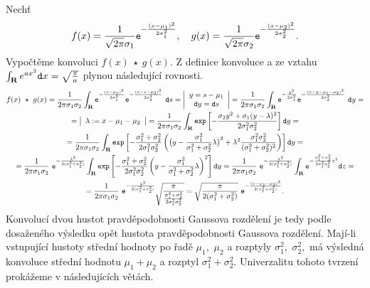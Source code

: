 Nech\v t $$f(x) =
\frac{1}{\sqrt{2\pi}\sigma_1}\mathtt{e}^{-\frac{(x-\mu_1)^2}{2\sigma_1^2}},\quad g(x) =
\frac{1}{\sqrt{2\pi}\sigma_2}\mathtt{e}^{-\frac{(x-\mu_2)^2}{2\sigma_2^2}}.$$ Vypo\v ct\v eme konvoluci $f(x)~\star~g(x).$ Z definice konvoluce a ze vztahu $\int_{{\mathbf R}}e^{ax^2}\mathtt{d}x=\sqrt{\frac{\pi}{a}}$ plynou následující rovnosti.
%
\begin{multline*}
f(x)~\star~g(x)=\frac{1}{2\pi\sigma_1\sigma_2}\int_{\mathbf R}  \mathtt{e}^{-\frac{(s-\mu_1)^2}{2\sigma_1^2}}\mathtt{e}^{-\frac{(x-s-\mu_2)^2}{2\sigma_2^2}}~\mathtt{d}s=\left|\begin{array}{c} y=s-\mu_1\\ \mathtt{d}y=\mathtt{d}s \end{array}\right|=\frac{1}{2\pi\sigma_1\sigma_2}\int_{\mathbf R}  \mathtt{e}^{-\frac{y^2}{2\sigma_1^2}}\mathtt{e}^{-\frac{(x-y-\mu_1-\mu_2)^2}{2\sigma_2^2}}~\mathtt{d}y{}=\\
=\left|\begin{array}{c} \lambda :=x-\mu_1-\mu_2 \end{array}\right|= \frac{1}{2\pi\sigma_1\sigma_2}\int_{\mathbf R}  \mathtt{exp}\left[-\frac{\sigma_2y^2+\sigma_1(y-\lambda)^2}{2\sigma_1^2\sigma_2^2}\right]\mathtt{d}y{}=\\
=\frac{1}{2\pi\sigma_1\sigma_2}\int_{\mathbf R}  \mathtt{exp}\left[-\frac{\sigma_1^2+\sigma_2^2}{2\sigma_1^2\sigma_2^2}\left(\bigl(y-\frac{\sigma_1^2}{\sigma_1^2+\sigma_2^2}\lambda\bigr)^2+\lambda^2\frac{\sigma_1^2\sigma_2^2}{(\sigma_1^2+\sigma_2^2)^2}\right)\right]\mathtt{d}y {}=\\
=\frac{1}{2\pi\sigma_1\sigma_2}~\mathtt{e}^{-\frac{\lambda^2}{2(\sigma_1^2+\sigma_2^2)}}\int_{\mathbf R}  \mathtt{exp}\left[-\frac{\sigma_1^2+\sigma_2^2}{2\sigma_1^2\sigma_2^2}\left(y-\frac{\sigma_1^2}{\sigma_1^2+\sigma_2^2}\lambda\right)^2\right]\mathtt{d}y = \frac{1}{2\pi\sigma_1\sigma_2}~\mathtt{e}^{-\frac{\lambda^2}{2(\sigma_1^2+\sigma_2^2)}}\int_{\mathbf R}  \mathtt{e}^{-\frac{\sigma_1^2+\sigma_2^2}{2\sigma_1^2\sigma_2^2}z^2}\mathtt{d}z{}=\\
= \frac{1}{2\pi\sigma_1\sigma_2}~\mathtt{e}^{-\frac{\lambda^2}{2(\sigma_1^2+\sigma_2^2)}} \sqrt{\frac{\pi}{\frac{\sigma_1^2+\sigma_2^2}{2\sigma_1^2\sigma_2^2}}}= \sqrt{\frac{\pi}{2(\sigma_1^2+\sigma_2^2)}}~ \mathtt{e}^{-\frac{(x-\mu_1-\mu_2)^2}{2(\sigma_1^2+\sigma_2^2)}}.
\end{multline*}
%
Konvoluc\'i dvou hustot pravd\v epodobnosti Gaussova rozd\v elen\'i je tedy podle dosa\v zen\'eho v\'ysledku op\v et hustota pravd\v epodobnosti Gaussova rozd\v elen\'i. Maj\'i-li vstupuj\'ic\'i hustoty st\v redn\'i hodnoty po \v rad\v e $\mu_1,$ $\mu_2$ a rozptyly $\sigma_1^2,$ $\sigma_2^2,$ m\'a v\'ysledn\'a konvoluce st\v redn\'i hodnotu $\mu_1+\mu_2$ a rozptyl $\sigma_1^2+\sigma_2^2.$ Univerzalitu tohoto tvrzen\'i prok\'a\v zeme v n\'asleduj\'ic\'ich v\v et\'ach.

